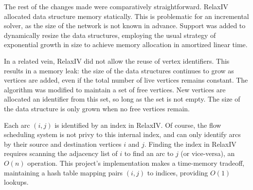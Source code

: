 The rest of the changes made were comparatively straightforward. RelaxIV allocated data structure memory statically. This is problematic for an incremental solver, as the size of the network is not known in advance. Support was added to dynamically resize the data structures, employing the usual strategy of exponential growth in size to achieve memory allocation in amortized linear time\footnotemark.

In a related vein, RelaxIV did not allow the reuse of vertex identifiers. This results in a memory leak: the size of the data structures continues to grow as vertices are added, even if the total number of live vertices remains constant. The algorithm was modified to maintain a set of free vertices. New vertices are allocated an identifier from this set, so long as the set is not empty. The size of the data structure is only grown when no free vertices remain.

Each arc $(i,j)$ is identified by an index in RelaxIV. Of course, the flow scheduling system is not privy to this internal index, and can only identify arcs by their source and destination vertices $i$ and $j$. Finding the index in RelaxIV requires scanning the adjacency list of $i$ to find an arc to $j$ (or vice-versa), an $O(n)$ operation. This project's implementation makes a time-memory tradeoff, maintaining a hash table mapping pairs $(i,j)$ to indices, providing $O(1)$ lookups\footnotemark.


